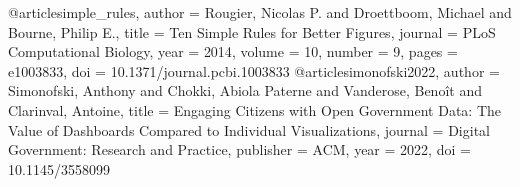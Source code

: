 @article{simple_rules,
  author  = {Rougier, Nicolas P. and Droettboom, Michael and Bourne, Philip E.},
  title   = {Ten Simple Rules for Better Figures},
  journal = {PLoS Computational Biology},
  year    = {2014},
  volume  = {10},
  number  = {9},
  pages   = {e1003833},
  doi     = {10.1371/journal.pcbi.1003833}
}
@article{simonofski2022,
author    = {Simonofski, Anthony and Chokki, Abiola Paterne
             and Vanderose, Benoît and Clarinval, Antoine},
title     = {Engaging Citizens with Open Government Data:
             The Value of Dashboards Compared to
             Individual Visualizations},
journal   = {Digital Government: Research and Practice},
publisher = {ACM},
year      = {2022},
doi       = {10.1145/3558099}
}
